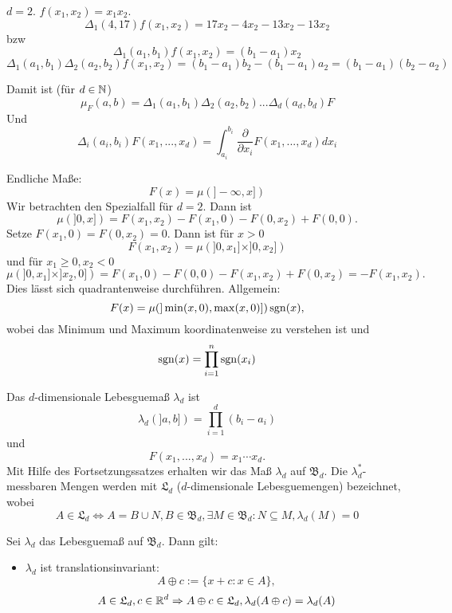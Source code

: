 			\begin{bsp}
				$d=2$. $f(x_1,x_2)=x_1x_2$. 
				\[ \Delta_1(4,17)f(x_1,x_2)=17x_2-4x_2-13x_2-13x_2 \]
				bzw
				\[ \Delta_1(a_1,b_1)f(x_1,x_2)=(b_1-a_1)x_2 \]
				\[ \Delta_1(a_1,b_1)\Delta_2(a_2,b_2)f(x_1,x_2)=(b_1-a_1)b_2-(b_1-a_1)a_2=(b_1-a_1)(b_2-a_2) \]
			
			\end{bsp}
			\begin{bem}
				Damit ist (für $d\in\mathbb{N}$)
				\[ \mu_F(a,b)=\Delta_1(a_1,b_1)\Delta_2(a_2,b_2)...\Delta_d(a_d,b_d)F \]
				Und
				\[ \Delta_i(a_i,b_i) F(x_1,...,x_d)=\int_{a_i}^{b_i}\frac{\partial}{\partial x_i} F(x_1,...,x_d)dx_i \]
			\end{bem}
			
			\begin{bsp}
				Endliche Maße:
				\[ F(x)=\mu(]-\infty,x]) \]
				Wir betrachten den Spezialfall für $d=2$. Dann ist
				\[ \mu(]0,x])=F(x_1,x_2)-F(x_1,0)-F(0,x_2)+F(0,0). \]
				Setze  $F(x_1,0)=F(0,x_2)=0$. Dann ist für $x>0$
				\[ F(x_1,x_2)=\mu(]0,x_1]\times]0,x_2]) \]
				und für $x_1\ge 0, x_2 <0$
				\[ \mu(]0,x_1]\times]x_2,0])=F(x_1,0)-F(0,0)-F(x_1,x_2)+F(0,x_2)=-F(x_1,x_2). \]
				Dies lässt sich quadrantenweise durchführen. \newline
				Allgemein: 
				\[ F(x)=\mu(]\min(x,0),\max(x,0)])\operatorname{sgn}(x), \]
				wobei das Minimum und Maximum koordinatenweise zu verstehen ist und 
				\[ \operatorname{sgn}(x)=\prod_{i=1}^{n}\operatorname{sgn}(x_i) \]
			\end{bsp}
			
			\begin{defi}
				Das $d$-dimensionale Lebesguemaß $\lambda_d$ ist
				\[ \lambda_d(]a,b])=\prod_{i=1}^d(b_i-a_i) \]
				und
				\[ F(x_1,...,x_d)=x_1\cdots x_d. \]
				Mit Hilfe des Fortsetzungssatzes erhalten wir das Maß $\lambda_d$ auf $\mathfrak{B}_d$.\newline
				Die $\lambda_d^*$-messbaren Mengen werden mit $\mathfrak{L}_d$ ($d$-dimensionale Lebesguemengen) bezeichnet, wobei
				\[ A\in \mathfrak{L}_d\Leftrightarrow A=B\cup N, B\in\mathfrak{B}_d, \exists M\in\mathfrak{B}_d: N\subseteq M, \lambda_d(M)=0 \] 
			\end{defi}
			
			\begin{satz}
				Sei $\lambda_d$ das Lebesguemaß auf $\mathfrak{B}_d$. Dann gilt:
				\begin{itemize}
					\item $\lambda_d$ ist translationsinvariant:
					\[ A\oplus c:=\{x+c:x\in A\}, \]
					\[ A\in\mathfrak{L}_d, c\in\mathbb{R}^d\Rightarrow A\oplus c\in \mathfrak{L}_d, \lambda_d(A\oplus c)=\lambda_d(A) \]
				\end{itemize}
			\end{satz}
			
